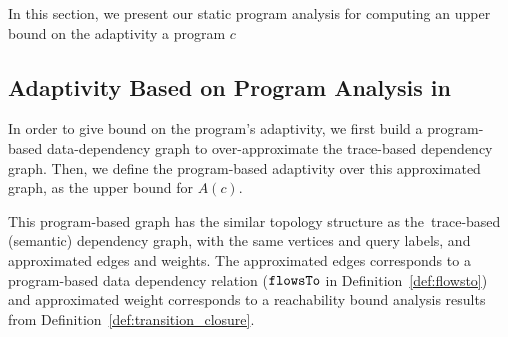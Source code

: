 In this section, we present our static program analysis for computing an upper bound on the adaptivity a program $c$
%
\subsection{Adaptivity Based on Program Analysis in \THESYSTEM}
In order to give bound on the program's adaptivity, 
we first build a program-based data-dependency graph to {over-}approximate the 
trace-based dependency graph. 
Then, we define the program-based adaptivity over this approximated graph, as the upper bound for $A(c)$.

This program-based graph has the similar topology structure as the trace-based (semantic) dependency graph, with the same vertices and query labels, 
and approximated edges and weights. 
The approximated edges corresponds to a program-based data dependency relation ($\mathtt{flowsTo}$ in Definition~\ref{def:flowsto}) and approximated weight corresponds to a reachability bound analysis results from Definition~\ref{def:transition_closure}.

%
